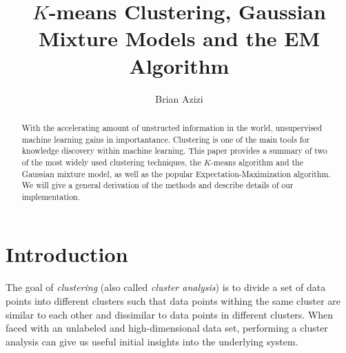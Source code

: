 \documentclass[final,3p,times,twocolumn]{elsarticle}
\begin{document}
\begin{frontmatter}



\title{$K$-means Clustering, Gaussian Mixture Models and the EM Algorithm}


\author{Brian Azizi}

\address{Cavendish Laboratory, Department of Physics, J J Thomson
  Avenue, Cambridge. CB3 0HE}

\begin{abstract}
With the accelerating amount of unstructed information in the world, unsupervised machine learning gains in importantance.
Clustering is one of the main tools for knowledge discovery within machine learning.
This paper provides a summary of two of the most widely used clustering techniques, the $K$-means algorithm and the Gaussian mixture model, as well as the popular Expectation-Maximization algorithm.
We will give a general derivation of the methods and describe details of our implementation.
\end{abstract}

\end{frontmatter}


\section{Introduction}
\label{sect:Intro}
The goal of \emph{clustering} (also called \emph{cluster analysis}) is to divide a set of data points into different clusters such that data points withing the same cluster are similar to each other and dissimilar to data points in different clusters. 
When faced with an unlabeled and high-dimensional data set, performing a cluster analysis can give us useful initial insights into the underlying system.
\end{document}
